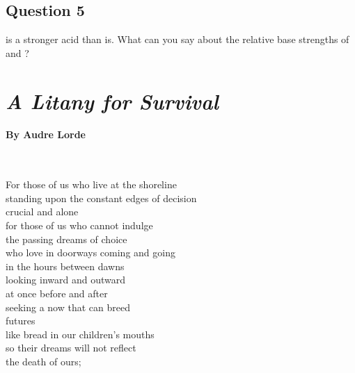 \documentclass[11pt, letterpaper]{memoir}
\begin{document}
{	
	
	\vspace{4em}
	
	\vspace{4em}
	
	\vspace{3em}
	\subsection*{Question 5}
	 is a stronger acid than  is. What can you say about the relative base strengths of  and ?
	
	\newpage
	\pagestyle{empty}
	\addtocounter{page}{-1}
	\section*{\emph{A Litany for Survival}}
	\paragraph{By Audre Lorde}~
	
	\vspace{1em}\noindent
	\begin{minipage}[t]{0.56\linewidth}
		For those of us who live at the shoreline\\
		standing upon the constant edges of decision\\
		crucial and alone\\
		for those of us who cannot indulge\\
		the passing dreams of choice\\
		who love in doorways coming and going\\
		in the hours between dawns\\
		looking inward and outward\\
		at once before and after\\
		seeking a now that can breed\\
		futures\\
		like bread in our children’s mouths\\
		so their dreams will not reflect\\
		the death of ours;
		

\end{minipage}}
\end{document}
